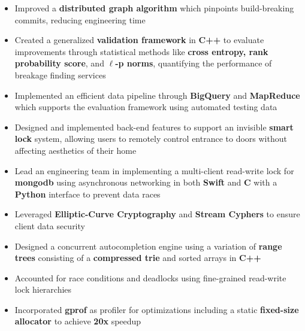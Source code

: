 \documentclass[10pt,a4paper,ragged2e]{altacv}
\begin{document}
\begin{itemize}
    \item Improved a \textbf{distributed graph algorithm} which pinpoints build-breaking commits,
      reducing engineering time
    \item Created a generalized \textbf{validation framework} in \textbf{C++} to evaluate improvements
      through statistical methods like \textbf{cross entropy, rank probability score}, and \textbf{$\ell$-p norms},
      quantifying the performance of breakage finding services
    \item Implemented an efficient data pipeline through \textbf{BigQuery} and \textbf{MapReduce}
      which supports the evaluation framework using automated testing data
\end{itemize}

\divider

\begin{itemize}
    \item Designed and implemented back-end features to support an invisible \textbf{smart lock} system,
        allowing users to remotely control entrance to doors without affecting aesthetics of their home
    \item Lead an engineering team in implementing a multi-client read-write lock for \textbf{mongodb} using asynchronous networking in both \textbf{Swift} and \textbf{C} with a \textbf{Python} interface to prevent data races
    \item Leveraged \textbf{Elliptic-Curve Cryptography} and \textbf{Stream Cyphers} to ensure client data security
\end{itemize}

\iffalse
{}
\begin{itemize}
    \item Designed a concurrent autocompletion engine using a variation of \textbf{range trees} consisting of a \textbf{compressed trie} and sorted arrays in \textbf{C++}
    \item Accounted for race conditions and deadlocks using fine-grained read-write lock hierarchies
    \item Incorporated \textbf{gprof} as profiler for optimizations including a static \textbf{fixed-size allocator} to achieve \textbf{20x} speedup
\end{itemize}
\end{document}
